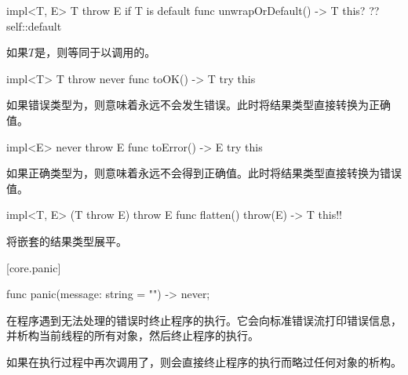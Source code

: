 \begin{itemdecl}
impl<T, E> T throw E if T is default {
    func unwrapOrDefault() -> T {
        this? ?? self::default
    }
}
\end{itemdecl}

\pnum
如果$T$是，则等同于以调用的。

\begin{itemdecl}
impl<T> T throw never {
    func toOK() -> T {
        try this
    }
}
\end{itemdecl}

\pnum
如果错误类型为，则意味着永远不会发生错误。此时将结果类型直接转换为正确值。

\begin{itemdecl}
impl<E> never throw E {
    func toError() -> E {
        try this
    }
}
\end{itemdecl}

\pnum
如果正确类型为，则意味着永远不会得到正确值。此时将结果类型直接转换为错误值。

\begin{itemdecl}
impl<T, E> (T throw E) throw E {
    func flatten() throw(E) -> T {
        this!!
    }
}
\end{itemdecl}

\pnum
{}将嵌套的结果类型展平。

[core.panic]{}

\begin{itemdecl}
func panic(message: string = "") -> never;
\end{itemdecl}

\pnum
{}在程序遇到无法处理的错误时终止程序的执行。它会向标准错误流打印错误信息，并析构当前线程的所有对象，然后终止程序的执行。

\pnum
如果在执行过程中再次调用了，则会直接终止程序的执行而略过任何对象的析构。